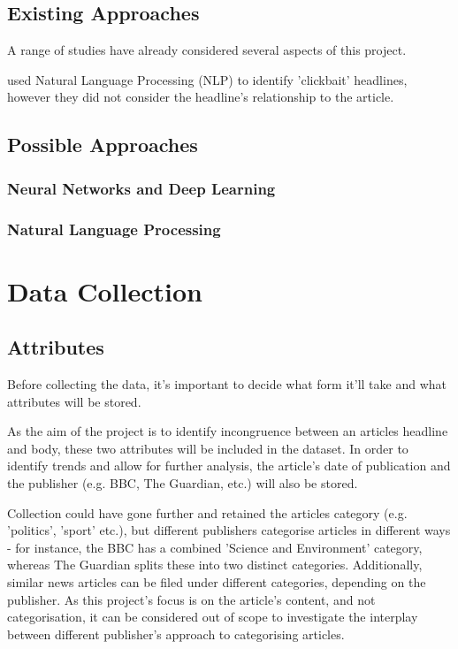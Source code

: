 \documentclass[12pt,a4paper]{article}
\begin{document}
\subsection{Existing Approaches}
A range of studies have already considered several aspects of this project.

 used Natural Language Processing (NLP) to identify 'clickbait' headlines, however they did not consider the headline's relationship to the article.

\citeA{}
 


\subsection{Possible Approaches}
\subsubsection{Neural Networks and Deep Learning}
\subsubsection{Natural Language Processing}

\section{Data Collection}

\subsection{Attributes}
Before collecting the data, it's important to decide what form it'll take and what attributes will be stored.

As the aim of the project is to identify incongruence between an articles headline and body, these two attributes will be included in the dataset. In order to identify trends and allow for further analysis, the article's date of publication and the publisher (e.g. BBC, The Guardian, etc.) will also be stored.

Collection could have gone further and retained the articles category (e.g. 'politics', 'sport' etc.), but different publishers categorise articles in different ways - for instance, the BBC has a combined 'Science and Environment' category, whereas The Guardian splits these into two distinct categories. Additionally, similar news articles can be filed under different categories, depending on the publisher. As this project's focus is on the article's content, and not categorisation, it can be considered out of scope to investigate the interplay between different publisher's approach to categorising articles.
\end{document}
